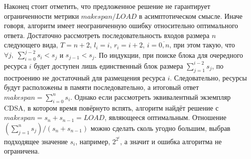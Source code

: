 Наконец стоит отметить, что предложенное решение не гарантирует ограниченности метрики $makespan/LOAD$ в асимптотическом смысле.
Иначе говоря, алгоритм имеет неограниченную ошибку относительно оптимального ответа.
Достаточно рассмотреть последовательность входов размера $n$ следующего вида, $T = n + 2$, $l_i = i$, $r_i = i + 2$, $i = \overline{0,n}$, при этом такую, что $\forall j,\;\sum_{i=0}^{j-2} s_i < s_j$ и $s_{j-1} < s_j$.
По индукции, при поиске блока для очередного ресурса $i$ будет доступен лишь единственный блок размера $\sum_{j=1}^{i-2} s_j$, по построению не достаточный для размещения ресурса $i$.
Следовательно, ресурсы будут расположены в памяти последовательно, а итоговый ответ $makespan = \sum_{i=0}^n s_i$.
Однако если рассмотреть эквивалентный экземпляр CDSA, в котором время повёрнуто вспять, алгоритм найдёт решение с $makespan = s_n + s_{n-1} = LOAD$, являющееся оптимальным.
Отношение $\left(\sum_{j=1}^{n} s_j\right)/\left(s_n + s_{n-1}\right)$ можно сделать сколь угодно большим, выбрав подходящее значение $s_i$, например, $2^{2^i}$, а значит и ошибка алгоритма не ограничена.
